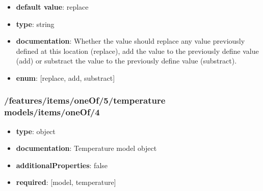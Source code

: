 \begin{itemize}\item {\bf default value}: replace
\item {\bf type}: string
\item {\bf documentation}: Whether the value should replace any value previously defined at this location (replace), add the value to the previously define value (add) or substract the value to the previously define value (substract).
\item {\bf enum}: [replace, add, substract]\end{itemize}\subsubsection{/features/items/oneOf/5/temperature models/items/oneOf/4}
\begin{itemize}\item {\bf type}: object
\item {\bf documentation}: Temperature model object
\item {\bf additionalProperties}: false
\item {\bf required}: [model, temperature]\end{itemize}
